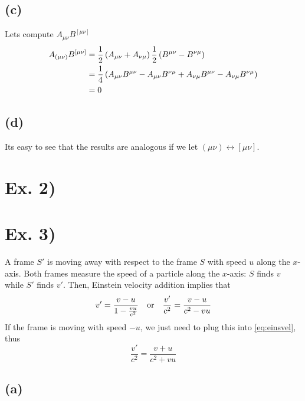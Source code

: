 \documentclass[oneside, 10pt, notitlepage]{book}
\begin{document}
\subsection*{(c)}

Lets compute \(A_{\mu\nu}B^{[\mu\nu]}\)
\begin{equation}
\begin{split}
    A_{(\mu\nu)}B^{[\mu\nu]} &= \frac{1}{2} \left(A_{\mu\nu}+A_{\nu\mu}\right) \frac{1}{2} \left(B^{\mu\nu}-B^{\nu\mu}\right) \\
    &= \frac{1}{4} \left(A_{\mu\nu}B^{\mu\nu} - A_{\mu\nu}B^{\nu\mu} + A_{\nu\mu}B^{\mu\nu} - A_{\nu\mu}B^{\nu\mu}\right) \\
    &= 0
\end{split}
\end{equation}

\subsection*{(d)}

Its easy to see that the results are analogous if we let \((\mu\nu)\leftrightarrow [\mu\nu]\).

\section*{Ex. 2)}


\section*{Ex. 3)}

A frame \(S'\) is moving away with respect to the frame \(S\) with speed \(u\) along the \(x\)-axis. Both frames measure the speed of a particle along the \(x\)-axis: \(S\) finds \(v\) while \(S'\) finds \(v'\). Then, Einstein velocity addition implies that
\begin{equation}\label{eq:einsvel}
    v' = \frac{v-u}{1-\frac{vu}{c^2}} \qq{or} \frac{v'}{c^2} = \frac{v-u}{c^2 - vu}
\end{equation}
If the frame is moving with speed \(-u\), we just need to plug this into \eqref{eq:einsvel}, thus
\begin{equation}\label{eq:einsvelminus}
    \frac{v'}{c^2} = \frac{v+u}{c^2+vu}
\end{equation}

\subsection*{(a)}
\end{document}
